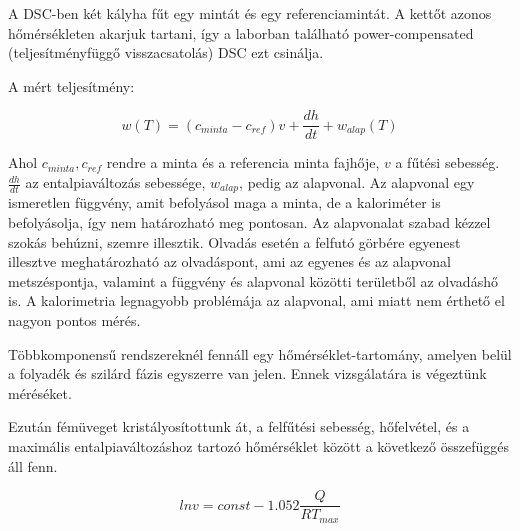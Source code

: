\documentclass[a4paper,12pt]{article}
\begin{document}
\par A DSC-ben két kályha fűt egy mintát és egy referenciamintát. A kettőt azonos hőmérsékleten akarjuk tartani, így a laborban található power-compensated (teljesítményfüggő visszacsatolás) DSC ezt csinálja. 

\vspace{5mm}

\par A mért teljesítmény:

\vspace{5mm}

\begin{equation*}
w(T) = (c_{minta} - c_{ref})v + \frac{dh}{dt} + w_{alap}(T)
\end{equation*}

\vspace{5mm}

\par Ahol $c_{minta}, c_{ref}$ rendre a minta és a referencia minta fajhője, $v$ a fűtési sebesség. $\frac{dh}{dt}$ az entalpiaváltozás sebessége, $w_{alap}$, pedig az alapvonal. Az alapvonal egy ismeretlen függvény, amit befolyásol maga a minta, de a kaloriméter is befolyásolja, így nem határozható meg pontosan. Az alapvonalat szabad kézzel szokás behúzni, szemre illesztik. Olvadás esetén a felfutó görbére egyenest illesztve meghatározható az olvadáspont, ami az egyenes és az alapvonal metszéspontja, valamint a függvény és alapvonal közötti területből az olvadáshő is. A kalorimetria legnagyobb problémája az alapvonal, ami miatt nem érthető el nagyon pontos mérés. 

\vspace{5mm}

\par Többkomponensű rendszereknél fennáll egy hőmérséklet-tartomány, amelyen belül a folyadék és szilárd fázis egyszerre van jelen. Ennek vizsgálatára is végeztünk méréséket.

\vspace{5mm}

\par Ezután fémüveget kristályosítottunk át, a felfűtési sebesség, hőfelvétel, és a maximális entalpiaváltozáshoz tartozó hőmérséklet között a következő összefüggés áll fenn.

\vspace{5mm}

\begin{equation*}
lnv = const - 1.052\frac{Q}{RT_{max}}
\end{equation*}
\end{document}
